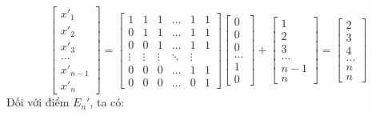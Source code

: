 \documentclass[12pt,a4paper]{article}
\begin{document}
\[
\begin{bmatrix}
    x'_1 \\ x'_2 \\ x'_3 \\ ... \\ x'_{n-1} \\ x'_n
\end{bmatrix} = \begin{bmatrix}
1 & 1 & 1 & \dots & 1 & 1 \\
0 & 1 & 1 & \dots & 1 & 1 \\
0 & 0 & 1 & \dots & 1 & 1 \\
\vdots & \vdots & \vdots & \ddots & \vdots \\
0 & 0 & 0 & \dots & 1 & 1 \\
0 & 0 & 0 & \dots & 0 & 1
\end{bmatrix} \begin{bmatrix}
    0 \\ 0 \\ 0 \\ \dots \\ 1 \\ 0
\end{bmatrix} + \begin{bmatrix}
    1 \\ 2 \\ 3 \\ ... \\ n-1 \\ n
\end{bmatrix} = \begin{bmatrix}
    2 \\ 3 \\ 4 \\ \dots \\ n \\ n
\end{bmatrix}
\]
Đối với điểm \(E_n'\), ta có: 
\end{document}
